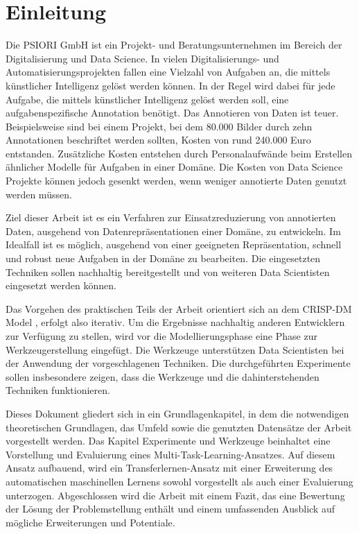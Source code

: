 \chapter{Einleitung}
\label{chap:Einleitung}
	Die PSIORI GmbH \cite{PSIORIGmbH.2020} ist ein Projekt- und Beratungsunternehmen im Bereich der Digitalisierung und Data Science. In vielen Digitalisierungs- und Automatisierungsprojekten fallen eine Vielzahl von Aufgaben an, die mittels künstlicher Intelligenz gelöst werden können. In der Regel wird dabei für jede Aufgabe, die mittels künstlicher Intelligenz gelöst werden soll, eine aufgabenspezifische Annotation benötigt. Das Annotieren von Daten ist teuer. Beispielsweise sind bei einem Projekt, bei dem 80.000 Bilder durch zehn Annotationen beschriftet werden sollten, Kosten von rund 240.000 Euro entstanden. Zusätzliche Kosten entstehen durch Personalaufwände beim Erstellen ähnlicher Modelle für Aufgaben in einer Domäne. Die Kosten von Data Science Projekte können jedoch gesenkt werden, wenn weniger annotierte Daten genutzt werden müssen.
	
	Ziel dieser Arbeit ist es ein Verfahren zur Einsatzreduzierung von annotierten Daten, ausgehend von Datenrepräsentationen einer Domäne, zu entwickeln. Im Idealfall ist es möglich, ausgehend von einer geeigneten Repräsentation, schnell und robust neue Aufgaben in der Domäne zu bearbeiten. Die eingesetzten Techniken sollen nachhaltig bereitgestellt und von weiteren Data Scientisten eingesetzt werden können.
	
	Das Vorgehen des praktischen Teils der Arbeit orientiert sich an dem CRISP-DM Model \cite{Shearer.2000}, erfolgt also iterativ. Um die Ergebnisse nachhaltig anderen Entwicklern zur Verfügung zu stellen, wird vor die Modellierungsphase eine Phase zur Werkzeugerstellung eingefügt. Die Werkzeuge unterstützen Data Scientisten bei der Anwendung der vorgeschlagenen Techniken. Die durchgeführten Experimente sollen insbesondere zeigen, dass die Werkzeuge und die dahinterstehenden Techniken funktionieren. 
	
	Dieses Dokument gliedert sich in ein Grundlagenkapitel, in dem die notwendigen theoretischen Grundlagen, das Umfeld sowie die genutzten Datensätze der Arbeit vorgestellt werden. Das Kapitel Experimente und Werkzeuge beinhaltet eine Vorstellung und Evaluierung eines Multi-Task-Learning-Ansatzes. Auf diesem Ansatz aufbauend, wird ein Transferlernen-Ansatz mit einer Erweiterung des automatischen maschinellen Lernens sowohl vorgestellt als auch einer Evaluierung unterzogen. Abgeschlossen wird die Arbeit mit einem Fazit, das eine Bewertung der Lösung der Problemstellung enthält und einem umfassenden Ausblick auf mögliche Erweiterungen und Potentiale.
